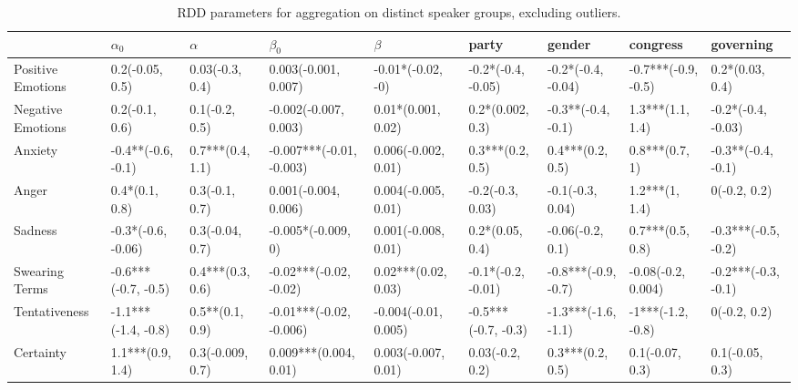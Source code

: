 \begin{table}[h]\centering
\caption{RDD parameters for aggregation on distinct speaker groups, excluding outliers.}
	\label{fig: Attributes_2}
\begin{adjustbox}{width=\linewidth, center}
	\begin{tabular}{lllllllll}
	\toprule
	{} &           $\alpha_0$ &             $\alpha$ &                 $\beta_0$ &                 $\beta$ &                party &               gender &             congress &            governing \\
	\midrule
	Positive Emotions     &      0.2(-0.05, 0.5) &      0.03(-0.3, 0.4) &      0.003(-0.001, 0.007) &       -0.01*(-0.02, -0) &   -0.2*(-0.4, -0.05) &   -0.2*(-0.4, -0.04) &  -0.7***(-0.9, -0.5) &      0.2*(0.03, 0.4) \\
	Negative Emotions     &       0.2(-0.1, 0.6) &       0.1(-0.2, 0.5) &     -0.002(-0.007, 0.003) &      0.01*(0.001, 0.02) &     0.2*(0.002, 0.3) &   -0.3**(-0.4, -0.1) &     1.3***(1.1, 1.4) &   -0.2*(-0.4, -0.03) \\
	Anxiety               &   -0.4**(-0.6, -0.1) &     0.7***(0.4, 1.1) &  -0.007***(-0.01, -0.003) &     0.006(-0.002, 0.01) &     0.3***(0.2, 0.5) &     0.4***(0.2, 0.5) &       0.8***(0.7, 1) &   -0.3**(-0.4, -0.1) \\
	Anger                 &       0.4*(0.1, 0.8) &       0.3(-0.1, 0.7) &      0.001(-0.004, 0.006) &     0.004(-0.005, 0.01) &     -0.2(-0.3, 0.03) &     -0.1(-0.3, 0.04) &       1.2***(1, 1.4) &         0(-0.2, 0.2) \\
	Sadness               &   -0.3*(-0.6, -0.06) &      0.3(-0.04, 0.7) &        -0.005*(-0.009, 0) &     0.001(-0.008, 0.01) &      0.2*(0.05, 0.4) &     -0.06(-0.2, 0.1) &     0.7***(0.5, 0.8) &  -0.3***(-0.5, -0.2) \\
	Swearing Terms        &  -0.6***(-0.7, -0.5) &     0.4***(0.3, 0.6) &    -0.02***(-0.02, -0.02) &     0.02***(0.02, 0.03) &   -0.1*(-0.2, -0.01) &  -0.8***(-0.9, -0.7) &   -0.08(-0.2, 0.004) &  -0.2***(-0.3, -0.1) \\
	Tentativeness         &  -1.1***(-1.4, -0.8) &      0.5**(0.1, 0.9) &   -0.01***(-0.02, -0.006) &    -0.004(-0.01, 0.005) &  -0.5***(-0.7, -0.3) &  -1.3***(-1.6, -1.1) &    -1***(-1.2, -0.8) &         0(-0.2, 0.2) \\
	Certainty             &     1.1***(0.9, 1.4) &     0.3(-0.009, 0.7) &     0.009***(0.004, 0.01) &     0.003(-0.007, 0.01) &      0.03(-0.2, 0.2) &     0.3***(0.2, 0.5) &      0.1(-0.07, 0.3) &      0.1(-0.05, 0.3) \\

\end{tabular}
\end{adjustbox}
\end{table}
